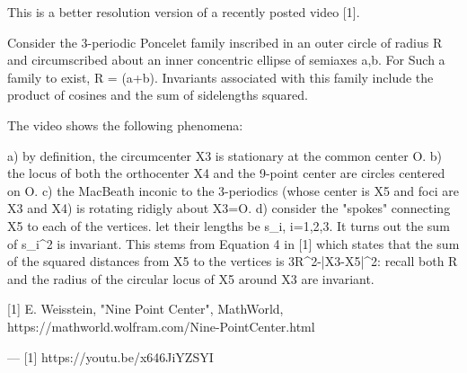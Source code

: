 This is a better resolution version of a recently posted video [1].

Consider the 3-periodic Poncelet family inscribed in an outer circle of radius R and circumscribed about an inner concentric ellipse of semiaxes a,b. For Such a family to exist, R = (a+b). Invariants associated with this family include the product of cosines and the sum of sidelengths squared.

The video shows the following phenomena:

a) by definition, the circumcenter X3 is stationary at the common center O.
b) the locus of both the orthocenter X4 and the 9-point center are circles centered on O.
c) the MacBeath inconic to the 3-periodics (whose center is X5 and foci are X3 and X4) is rotating ridigly about X3=O.
d) consider the "spokes" connecting X5 to each of the vertices. let their lengths be s_i, i=1,2,3. It turns out the sum of s_i^2 is invariant. This stems from Equation 4 in [1] which states that the sum of the squared distances from X5 to the vertices is 3R^2-|X3-X5|^2: recall both R and the radius of the circular locus of X5 around X3 are invariant. 

[1] E. Weisstein, "Nine Point Center", MathWorld, https://mathworld.wolfram.com/Nine-PointCenter.html

---
[1] https://youtu.be/x646JiYZSYI